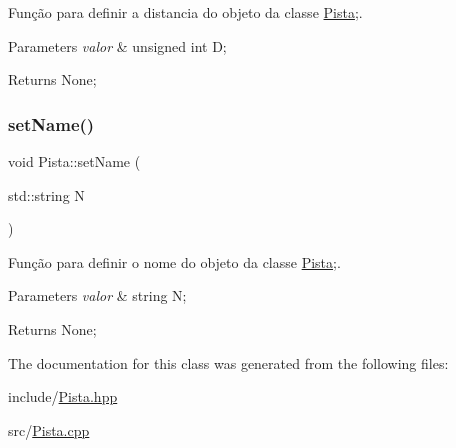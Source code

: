 Função para definir a distancia do objeto da classe \mbox{\hyperlink{class_pista}{Pista}};. 


\begin{DoxyParams}{Parameters}
{\em valor} & unsigned int D; \\
\hline
\end{DoxyParams}
\begin{DoxyReturn}{Returns}
None; 
\end{DoxyReturn}
\mbox{\label{class_pista_a39cca8d8b1504352bc1965bb5e82f9e6}} 
\subsubsection{\texorpdfstring{set\+Name()}{setName()}}
{\footnotesize\ttfamily void Pista\+::set\+Name (\begin{DoxyParamCaption}\item[{std\+::string}]{N }\end{DoxyParamCaption})}



Função para definir o nome do objeto da classe \mbox{\hyperlink{class_pista}{Pista}};. 


\begin{DoxyParams}{Parameters}
{\em valor} & string N; \\
\hline
\end{DoxyParams}
\begin{DoxyReturn}{Returns}
None; 
\end{DoxyReturn}


The documentation for this class was generated from the following files\+:\begin{DoxyCompactItemize}
\item 
include/\mbox{\hyperlink{_pista_8hpp}{Pista.\+hpp}}\item 
src/\mbox{\hyperlink{_pista_8cpp}{Pista.\+cpp}}\end{DoxyCompactItemize}
